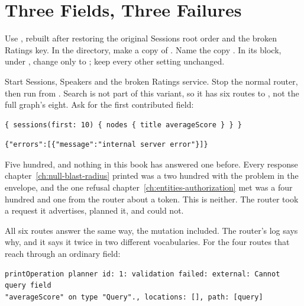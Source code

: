 \section{Three Fields, Three Failures}
\label{sec:ch15-three-fields-three-failures}

%
Use , rebuilt after restoring the original
Sessions root order and the broken Ratings key. In the 
directory, make a copy of . Name the copy
. In its  block,
under , change only  to
; keep every other setting unchanged.

Start Sessions, Speakers and the broken Ratings service. Stop the normal
router, then run  from
. Search is not part of this variant, so it has six routes to
, not the full graph's eight. Ask for the first contributed field:

\begin{verbatim}
{ sessions(first: 10) { nodes { title averageScore } } }
\end{verbatim}

\begin{verbatim}
{"errors":[{"message":"internal server error"}]}
\end{verbatim}

%
Five hundred, and nothing in this book has answered one before. Every response
chapter~\ref{ch:null-blast-radius} printed was a two hundred with the problem
in the envelope, and the one refusal chapter~\ref{ch:entities-authorization}
met was a four hundred and one from the router about a token. This is neither.
The router took a request it advertises, planned it, and could not.

%
All six routes answer the same way, the mutation included. The router's log
says why, and it says it twice in two different vocabularies. For the four
routes that reach  through an ordinary field:

\begin{verbatim}
printOperation planner id: 1: validation failed: external: Cannot query field
"averageScore" on type "Query"., locations: [], path: [query]
\end{verbatim}

